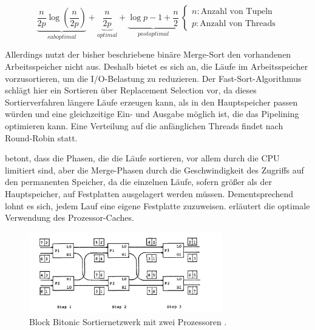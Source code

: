 \documentclass[a4paper,12pt,twoside]{article}
\begin{document}
\[
\underbrace{\frac{n}{2p} \log \left( \frac{n}{2p} \right)}_{suboptimal} + \underbrace{\frac{n}{2p}}_{optimal} + \underbrace{\log p - 1 + \frac{n}{2}}_{postoptimal} \:
\begin{cases}
n: \text{Anzahl von Tupeln}\\
p: \text{Anzahl von Threads}
\end{cases}
\]

Allerdings nutzt der bisher beschriebene binäre Merge-Sort den vorhandenen Arbeitsspeicher nicht aus. Deshalb bietet es sich an, die Läufe im Arbeitsspeicher vorzusortieren, um die I/O-Belastung zu reduzieren. Der Fast-Sort-Algorithmus \parencite{Tsukerman1986, Salzberg1990} schlägt hier ein Sortieren über Replacement Selection \parencite[vgl.][]{Knuth1973} vor, da dieses Sortierverfahren längere Läufe erzeugen kann, als in den Hauptspeicher passen würden und eine gleichzeitige Ein- und Ausgabe möglich ist, die das Pipelining optimieren kann. Eine Verteilung auf die anfänglichen Threads findet nach Round-Robin statt.

\textcite{Salzberg1990} betont, dass die Phasen, die die Läufe sortieren, vor allem durch die CPU limitiert sind, aber die Merge-Phasen durch die Geschwindigkeit des Zugriffs auf den permanenten Speicher, da die einzelnen Läufe, sofern größer als der Hauptspeicher, auf Festplatten ausgelagert werden müssen. Dementsprechend lohnt es sich, jedem Lauf eine eigene Festplatte zuzuweisen. \textcite{Hao2009} erläutert die optimale Verwendung des Prozessor-Caches.

\begin{figure}
	\centering
	\includegraphics[width=0.75\textwidth]{Bilder/bitonic_block.png}
	\caption{Block Bitonic Sortiernetzwerk mit zwei Prozessoren \parencite[S. 335]{Bitton1983}.}
	\label{img:bitonic}
\end{figure}
\end{document}
